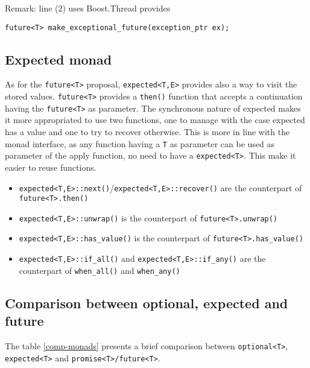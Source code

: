 \documentclass[a4paper,10pt]{article}
\newcommand{\cpp}[1]{\lstinline{#1}}
\begin{document}
Remark: line (2) uses Boost.Thread provides

\begin{lstlisting}
future<T> make_exceptional_future(exception_ptr ex);
\end{lstlisting}


\subsection{Expected monad}

As for the \cpp{future<T>} proposal, \cpp{expected<T,E>} provides also a way to visit the stored values.
\cpp{future<T>} provides a \cpp{then()} function that accepts a continuation having the \cpp{future<T>} as parameter. The synchronous nature of expected makes it more appropriated to use two functions, one to manage with the case expected has a value and one to try to recover otherwise. This is more in line with the monad interface, as any function having a \cpp{T} as parameter can be used as parameter of the apply function, no need to have a \cpp{expected<T>}. This make it easier to reuse functions. 

\begin{itemize}
 \item \cpp{expected<T,E>::next()}/\cpp{expected<T,E>::recover()} are the counterpart of \cpp{future<T>.then()}
 \item \cpp{expected<T,E>::unwrap()} is the counterpart of \cpp{future<T>.unwrap()}
 \item \cpp{expected<T,E>::has_value()} is the counterpart of \cpp{future<T>.has_value()}
 \item \cpp{expected<T,E>::if_all()} and \cpp{expected<T,E>::if_any()} are the counterpart of \cpp{when_all()} and \cpp{when_any()}
\end{itemize}

\subsection{Comparison between optional, expected and future}

The table \ref{comp-monads} presents a brief comparison between \cpp{optional<T>}, \cpp{expected<T>}  and \cpp{promise<T>/future<T>}.
\end{document}
